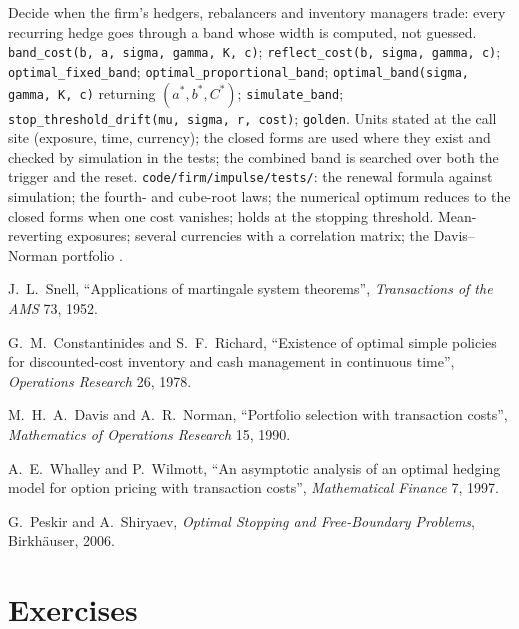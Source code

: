 \begin{build}
 Decide when the firm's hedgers, rebalancers and inventory managers trade: every recurring hedge goes through a
band whose width is computed, not guessed.
 \texttt{band\_cost(b, a, sigma, gamma, K, c)}; \texttt{reflect\_cost(b, sigma, gamma, c)};
\texttt{optimal\_fixed\_band}; \texttt{optimal\_proportional\_band}; \texttt{optimal\_band(sigma, gamma, K, c)} returning $(a^*, b^*,
C^*)$; \texttt{simulate\_band}; \texttt{stop\_threshold\_drift(mu, sigma, r, cost)}; \texttt{golden}.
 Units stated at the call site (exposure, time, currency); the closed forms are used where they exist and checked by
simulation in the tests; the combined band is searched over both the trigger and the reset.
 \texttt{code/firm/impulse/tests/}: the renewal formula against simulation; the fourth- and cube-root laws;
the numerical optimum reduces to the closed forms when one cost vanishes;  holds at the stopping threshold.
 Mean-reverting exposures; several currencies with a correlation matrix; the Davis--Norman portfolio .
\end{build}

\begin{omsources}
\item J.~L.~Snell, ``Applications of martingale system theorems'', \emph{Transactions of the AMS} 73, 1952.
\item G.~M.~Constantinides and S.~F.~Richard, ``Existence of optimal simple policies for discounted-cost inventory and cash
management in continuous time'', \emph{Operations Research} 26, 1978.
\item M.~H.~A.~Davis and A.~R.~Norman, ``Portfolio selection with transaction costs'', \emph{Mathematics of Operations Research}
15, 1990.
\item A.~E.~Whalley and P.~Wilmott, ``An asymptotic analysis of an optimal hedging model for option pricing with transaction
costs'', \emph{Mathematical Finance} 7, 1997.
\item G.~Peskir and A.~Shiryaev, \emph{Optimal Stopping and Free-Boundary Problems}, Birkhäuser, 2006.
\end{omsources}

\section{Exercises}

